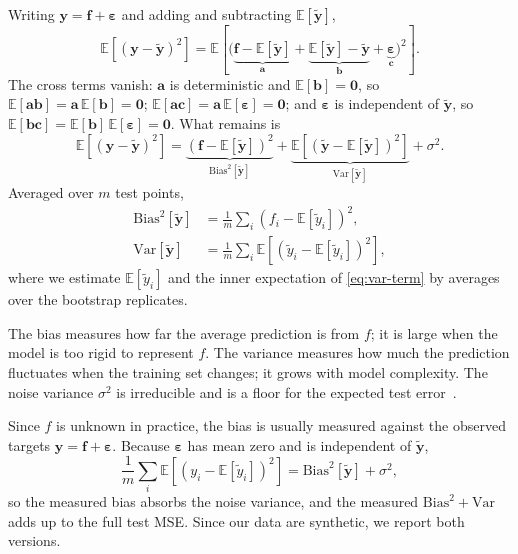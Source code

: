 Writing $\bm{y}=\bm{f}+\bm{\varepsilon}$ and adding and subtracting
$\mathbb{E}[\tilde{\bm{y}}]$,
\begin{equation}
    \mathbb{E}\!\left[(\bm{y}-\tilde{\bm{y}})^2\right]
    =\mathbb{E}\!\left[\big(
        \underbrace{\bm{f}-\mathbb{E}[\tilde{\bm{y}}]}_{\bm{a}}
        +\underbrace{\mathbb{E}[\tilde{\bm{y}}]-\tilde{\bm{y}}}_{\bm{b}}
        +\underbrace{\bm{\varepsilon}}_{\bm{c}}
    \big)^2\right].
\end{equation}
The cross terms vanish: $\bm{a}$ is deterministic and $\mathbb{E}[\bm{b}]=\bm{0}$, so
$\mathbb{E}[\bm{a}\bm{b}]=\bm{a}\,\mathbb{E}[\bm{b}]=\bm{0}$; $\mathbb{E}[\bm{a}\bm{c}]=\bm{a}\,\mathbb{E}[
\bm{\varepsilon}]=\bm{0}$; and $\bm{\varepsilon}$ is independent of
$\tilde{\bm{y}}$, so $\mathbb{E}[\bm{b}\bm{c}]=\mathbb{E}[\bm{b}]\,\mathbb{E}[\bm{\varepsilon}]
=\bm{0}$. What remains is
\begin{equation}\label{eq:bias-variance-decomposition}
    \mathbb{E}\!\left[(\bm{y}-\tilde{\bm{y}})^2\right]
    =\underbrace{\left(\bm{f}-\mathbb{E}[\tilde{\bm{y}}]\right)^2}_{\mathrm{Bias}^2[\tilde{\bm{y}}]}
    +\underbrace{\mathbb{E}\!\left[\left(\tilde{\bm{y}}-\mathbb{E}[\tilde{\bm{y}}]\right)^2\right]}_{\mathrm{Var}[\tilde{\bm{y}}]}
    +\sigma^2 .
\end{equation}
Averaged over $m$ test points,
\begin{align}
    \mathrm{Bias}^2[\tilde{\bm{y}}]
    &= \frac{1}{m}\sum_i\left(f_i - \mathbb{E}[\tilde{y}_i]\right)^2,
    \label{eq:bias-term}\\
    \mathrm{Var}[\tilde{\bm{y}}]
    &= \frac{1}{m}\sum_i\mathbb{E}\!\left[\left(\tilde{y}_i
    - \mathbb{E}[\tilde{y}_i]\right)^2\right], \label{eq:var-term}
\end{align}
where we estimate $\mathbb{E}[\tilde{y}_i]$ and the inner expectation of
\cref{eq:var-term} by averages over the bootstrap replicates.

The bias measures how far the average prediction is from $f$; it is large when
the model is too rigid to represent $f$. The variance measures how much the
prediction fluctuates when the training set changes; it grows with model
complexity. The noise variance $\sigma^2$ is irreducible and is a floor for the
expected test error~\cite{hjorth-jensen_2026}.

Since $f$ is unknown in practice, the bias is usually measured against the
observed targets $\bm{y}=\bm{f}+\bm{\varepsilon}$. Because $\bm{\varepsilon}$
has mean zero and is independent of $\tilde{\bm{y}}$,
\begin{equation}\label{eq:measured-bias}
    \frac{1}{m}\sum_i\mathbb{E}\!\left[(y_i-\mathbb{E}[\tilde{y}_i])^2\right]
    =\mathrm{Bias}^2[\tilde{\bm{y}}]+\sigma^2,
\end{equation}
so the measured bias absorbs the noise variance, and the measured
$\mathrm{Bias}^2+\mathrm{Var}$ adds up to the full test MSE. Since our data are
synthetic, we report both versions.

